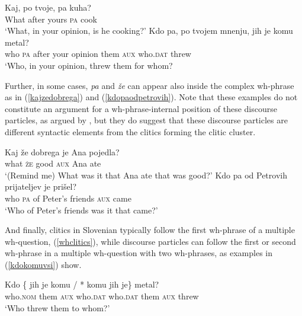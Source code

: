 \documentclass[output=paper,
modfonts,
newtxmath,
hidelinks
]{langscibook}
\begin{document}
\begin{exe}
\ex \label{kdopotvojepak} \gll 
 Kaj, po tvoje, pa kuha?\\
	What after yours	 \textsc{pa} cook\\
	\trans `What, in your opinion, is he cooking?'
\ex \label{kdopapotvoje}
 \gll Kdo pa, po tvojem mnenju, jih je komu metal?\\
	who \textsc{pa} after your opinion them \textsc{aux} who.\textsc{dat} threw\\
	\trans  `Who, in your opinion, threw them for whom?
\end{exe}

\noindent Further, in some cases, \textit{pa} and \textit{že} can appear also inside the complex wh-phrase as in (\ref{kajzedobrega}) and (\ref{kdopaodpetrovih}). Note that these examples do not constitute an argument for a wh-phrase-internal position of these discourse particles, as argued by \cite{marusicetal2015}, but they do suggest that these discourse particles are different syntactic elements from the clitics forming the clitic cluster.

\begin{exe}
\ex \label{kajzedobrega}
\gll Kaj že dobrega je Ana 	pojedla? \\
 	what \textsc{že} good \textsc{aux} Ana	ate\\
\trans  `(Remind me) What was it that Ana ate that was good?'
\ex \label{kdopaodpetrovih}
\gll Kdo pa od Petrovih prijateljev je prišel?\\
 	who \textsc{pa} of Peter's friends \textsc{aux} came\\
\glt  `Who of Peter's friends was it that came?'\\
\hfill\citep[(38)]{marusicetal2015}
\end{exe}

\noindent And finally, clitics in Slovenian typically follow the first wh-phrase of a multiple wh-question, (\ref{whclitics}), while discourse particles can follow the first or second wh-phrase in a multiple wh-question with two wh-phrases, as examples in (\ref{kdokomuvsi}) show.  

\begin{exe}
\ex  \label{whclitics}
 \gll Kdo \{\hspace{-2pt} jih je komu / *\hspace{-2pt} komu jih je\} metal?\\
   who.\textsc{nom} {} them \textsc{aux} who.\textsc{dat} {} {} who.\textsc{dat} them \textsc{aux} threw \\
   \glt `Who threw them to whom?'
\end{exe}
\end{document}
